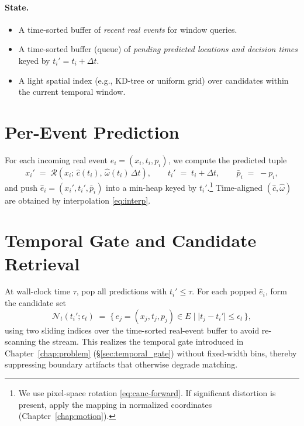 \paragraph{State.}
\begin{itemize}
    \item A time-sorted buffer of \emph{recent real events} for window queries.
    \item A time-sorted buffer (queue) of \emph{pending predicted locations and decision times} keyed by $t_i'=t_i+\Delta t$.
    \item A light spatial index (e.g., KD-tree or uniform grid) over candidates within the current temporal window.
\end{itemize}

\section{Per-Event Prediction}
For each incoming real event $e_i=(x_i,t_i,p_i)$, we compute the predicted tuple
\begin{equation}
x_i' \;=\; \mathcal{R}\!\left(x_i;\,\hat c(t_i),\,\hat\omega(t_i)\,\Delta t\right),
\qquad
t_i' \;=\; t_i+\Delta t,
\qquad
\bar p_i \;=\; -p_i,
\label{eq:canc-forward}
\end{equation}
and push $\hat e_i=(x_i',t_i',\bar p_i)$ into a min-heap keyed by $t_i'$.\footnote{We use pixel-space rotation \eqref{eq:canc-forward}. If significant distortion is present, apply the mapping in normalized coordinates (Chapter~\ref{chap:motion}).} Time-aligned $(\hat c,\hat\omega)$ are obtained by interpolation \eqref{eq:interp}.

\section{Temporal Gate and Candidate Retrieval}
At wall-clock time $\tau$, pop all predictions with $t_i' \le \tau$. For each popped $\hat e_i$, form the candidate set
\begin{equation}
\mathcal{N}_t(t_i';\epsilon_t) \;=\; \{\,e_j=(x_j,t_j,p_j)\in E \;|\; |t_j - t_i'| \le \epsilon_t \,\},
\label{eq:true-window}
\end{equation}
using two sliding indices over the time-sorted real-event buffer to avoid re-scanning the stream. This realizes the temporal gate introduced in Chapter~\ref{chap:problem} (\S\ref{sec:temporal_gate}) without fixed-width bins, thereby suppressing boundary artifacts that otherwise degrade matching.

